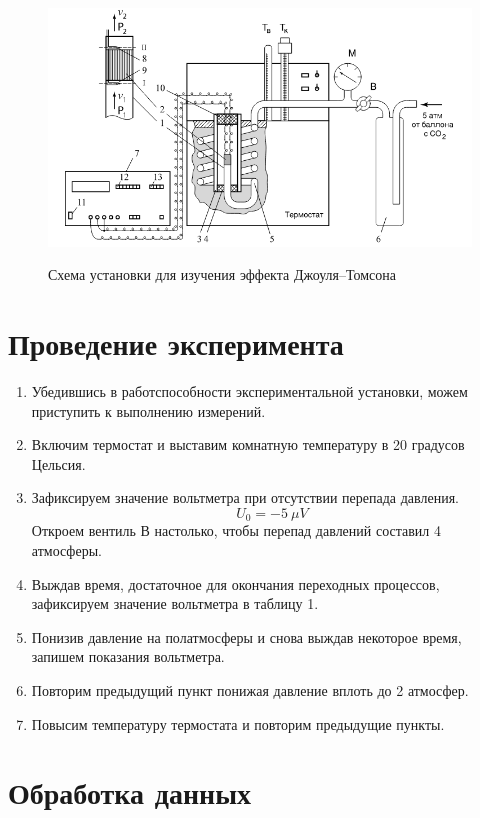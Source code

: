 \documentclass[14pt, a4paper]{report}
\begin{document}
\begin{figure}[!ht]
\centering
\includegraphics[scale=0.6]{terma_1_1.png}
\label{image1}
\caption{Схема установки для изучения эффекта Джоуля–Томсона}
\end{figure}

\section{Проведение эксперимента}

\begin{enumerate}
\item Убедившись в работспособности экспериментальной установки, можем приступить к выполнению измерений.
\item Включим термостат и выставим комнатную температуру в 20 градусов Цельсия.
\item Зафиксируем значение вольтметра при отсутствии перепада давления.
\[U_0=-5\ \mu V\]
Откроем вентиль В настолько, чтобы перепад давлений составил 4 атмосферы.
\item Выждав время, достаточное для окончания переходных процессов, зафиксируем значение вольтметра в таблицу 1.
\item Понизив давление на полатмосферы и снова выждав некоторое время, запишем показания вольтметра.
\item Повторим предыдущий пункт понижая давление вплоть до 2 атмосфер.
\item Повысим температуру термостата и повторим предыдущие пункты.

\end{enumerate}

\section{Обработка данных}
\end{document}
